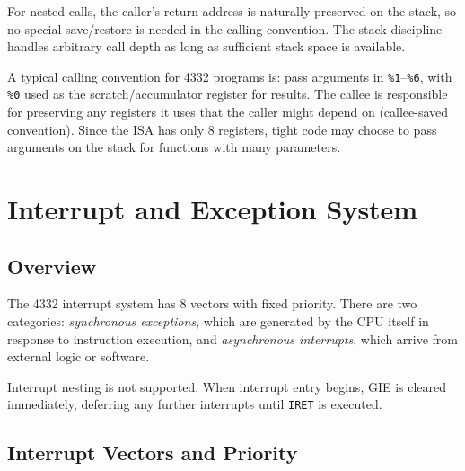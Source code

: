 \documentclass[a4paper,12pt]{report}
\newcommand{\asm}[1]{\texttt{#1}}
\newcommand{\reg}[1]{\texttt{\%#1}}
\begin{document}
For nested calls, the caller's return address is naturally preserved on the stack, so no special save/restore is needed in the calling convention. The stack discipline handles arbitrary call depth as long as sufficient stack space is available.

A typical calling convention for 4332 programs is: pass arguments in \reg{1}--\reg{6}, with \reg{0} used as the scratch/accumulator register for results. The callee is responsible for preserving any registers it uses that the caller might depend on (callee-saved convention). Since the ISA has only 8 registers, tight code may choose to pass arguments on the stack for functions with many parameters.

\chapter{Interrupt and Exception System}
\label{ch:interrupts}

\section{Overview}

The 4332 interrupt system has 8 vectors with fixed priority. There are two categories: \emph{synchronous exceptions}, which are generated by the CPU itself in response to instruction execution, and \emph{asynchronous interrupts}, which arrive from external logic or software.

Interrupt nesting is not supported. When interrupt entry begins, GIE is cleared immediately, deferring any further interrupts until \asm{IRET} is executed.

\section{Interrupt Vectors and Priority}
\end{document}
